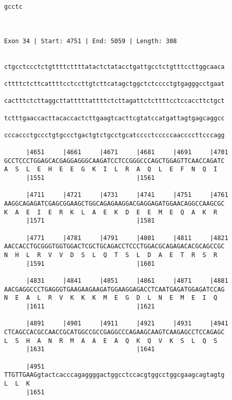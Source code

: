 \documentclass{article}
\begin{document}
\begin{Verbatim}
gcctc
     
     
 
Exon 34 | Start: 4751 | End: 5059 | Length: 308


ctgcctccctctgttttcttttatactctatacctgattgcctctgtttccttggcaaca
                                                            
cttttctcttcattttcctccttgtcttcatagctggctctcccctgtgagggcctgaat
                                                            
cactttctcttaggcttatttttattttctcttagattctcttttcctccaccttctgct
                                                            
tctttgaaccacttacaccactcttgaagtcacttcgtatccatgattagtgagcaggcc
                                                            
cccaccctgccctgtgccctgactgtctgcctgcatcccctcccccaaccccttcccagg
                                                            
      |4651     |4661     |4671     |4681     |4691     |4701
GCCTCCCTGGAGCACGAGGAGGGCAAGATCCTCCGGGCCCAGCTGGAGTTCAACCAGATC
A  S  L  E  H  E  E  G  K  I  L  R  A  Q  L  E  F  N  Q  I  
      |1551                         |1561                   
  
      |4711     |4721     |4731     |4741     |4751     |4761
AAGGCAGAGATCGAGCGGAAGCTGGCAGAGAAGGACGAGGAGATGGAACAGGCCAAGCGC
K  A  E  I  E  R  K  L  A  E  K  D  E  E  M  E  Q  A  K  R  
      |1571                         |1581                   
  
      |4771     |4781     |4791     |4801     |4811     |4821
AACCACCTGCGGGTGGTGGACTCGCTGCAGACCTCCCTGGACGCAGAGACACGCAGCCGC
N  H  L  R  V  V  D  S  L  Q  T  S  L  D  A  E  T  R  S  R  
      |1591                         |1601                   
  
      |4831     |4841     |4851     |4861     |4871     |4881
AACGAGGCCCTGAGGGTGAAGAAGAAGATGGAAGGAGACCTCAATGAGATGGAGATCCAG
N  E  A  L  R  V  K  K  K  M  E  G  D  L  N  E  M  E  I  Q  
      |1611                         |1621                   
  
      |4891     |4901     |4911     |4921     |4931     |4941
CTCAGCCACGCCAACCGCATGGCCGCCGAGGCCCAGAAGCAAGTCAAGAGCCTCCAGAGC
L  S  H  A  N  R  M  A  A  E  A  Q  K  Q  V  K  S  L  Q  S  
      |1631                         |1641                   
  
      |4951                                                 
TTGTTGAAGgtactcacccagaggggactggcctccacgtggcctggcgaagcagtagtg
L  L  K                                                     
      |1651
  

\end{Verbatim}
\end{document}
